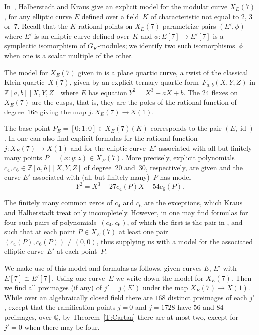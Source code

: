 \documentclass[12pt, reqno]{amsart}
\newcommand{\Q}{\mathbb{Q}}
\newcommand{\Z}{\mathbb{Z}}
\DeclareMathOperator{\id}{id}
\numberwithin{equation}{section}
\theoremstyle{definition}
\theoremstyle{remark}
\begin{document}
In~\cite{Halberstadt-Kraus-XE7}, Halberstadt and Kraus give an
explicit model for the modular curve $X_E(7)$, for any elliptic curve
$E$ defined over a field~$K$ of characteristic not equal to $2$, $3$
or~$7$. Recall that the $K$-rational points on $X_E(7)$ parametrize
pairs $(E',\phi)$ where $E'$ is an elliptic curve defined over~$K$ and
$\phi:E[7]\to E'[7]$ is a symplectic isomorphism of $G_K$-modules; we
identify two such isomorphisms~$\phi$ when one is a scalar multiple of
the other.

The model for $X_E(7)$ given in \cite{Halberstadt-Kraus-XE7} is a
plane quartic curve, a twist of the classical Klein quartic~$X(7)$,
given by an explicit ternary quartic form~$F_{a,b}(X,Y,Z)$ in
$\Z[a,b][X,Y,Z]$ where $E$ has equation $Y^2=X^3+aX+b$.  The $24$
flexes on $X_E(7)$ are the cusps, that is, they are the poles of the
rational function of degree~$168$ giving the map $j:X_E(7)\to
X(1)$.

The base point $P_E=[0:1:0]\in X_E(7)(K)$ corresponds to the pair
$(E,\id)$.  In \cite{Halberstadt-Kraus-XE7} one can also find explicit formulas
for the rational function $j:X_E(7)\to X(1)$ and for the elliptic curve~$E'$
associated with all 
but finitely many points $P=(x:y:z)\in
X_E(7)$. More precisely, 
explicit polynomials $c_4, c_6 \in \Z[a,b][X,Y,Z]$
of degree~$20$ and~$30$, respectively, are given and the curve $E'$ associated with (all but finitely many)~$P$ has model
\[Y^2=X^3-27c_4(P)X-54c_6(P).\]

The finitely many common zeros of $c_4$
and $c_6$ are the exceptions, which Kraus and Halberstadt treat only
incompletely.  However, in \cite{Fisher} one may find formulas for
four such pairs of polynomials~$(c_4,c_6)$, of which the first is the pair in
\cite{Halberstadt-Kraus-XE7}, and such that at each point $P\in
X_E(7)$ at least one pair $(c_4(P),c_6(P))\not=(0,0)$, thus supplying
us with a model for the associated elliptic 
curve~$E'$ at each point~$P$.

We make use of this model and formulas as follows, given curves $E$,
$E'$ with $E[7]\cong E'[7]$.  Using one curve~$E$ we write down the
model for $X_E(7)$.  Then we find all preimages (if any) of $j'=j(E')$
under the map $X_E(7)\to X(1)$.  While over an algebraically closed
field there are $168$ distinct preimages of each $j'$, except that the
ramification points $j=0$ and $j=1728$ have $56$ and $84$ preimages,
over $\Q$, by Theorem~\ref{T:Cartan} there are at most two, except
for $j'=0$ when there may be four.
\end{document}
